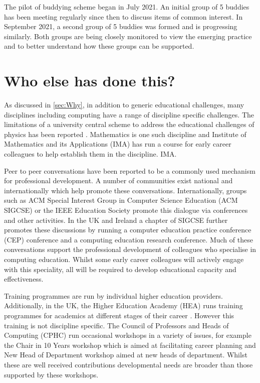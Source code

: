 \documentclass[sigconf]{acmart}
\begin{document}
\begin{comment}
To DO - evaluation of Buddying - PH what is needed here? Is sufficient to indicate the first pilot of 10 buddies has been established? Or do we need feedback from the participants?
\end{comment}

The pilot of buddying scheme began in July 2021. An initial group of 5 buddies has been meeting regularly since then to discuss items of common interest. In September 2021, a second group of 5 buddies was formed and is progressing similarly. Both groups are being closely monitored to view the emerging practice and to better understand how these groups can be supported.


\section{Who else has done this?}
As discussed in \ref{sec:Why}, in addition to generic educational challenges, many disciplines including computing have a range of discipline specific challenges. The limitations of a university central scheme to address the educational challenges of physics has been reported \cite{Magueijo2009}.  Mathematics is one such discipline and Institute of Mathematics and its Applications (IMA) has run a course for early career colleagues to help establish them in the discipline. {IMA}.  

Peer to peer conversations have been reported to be a commonly used mechanism for professional development\cite{King2004}. A number of communities exist national and internationally which help promote these conversations. Internationally, groups such as ACM Special Interest Group in Computer Science Education (ACM SIGCSE) or the IEEE Education Society promote this dialogue via conferences and other activities.  In the UK and Ireland a chapter of SIGCSE further promotes these discussions by running a computer education practice conference (CEP) conference and a computing education research conference. Much of these conversations support the professional development of colleagues who specialise in computing education. Whilst some early career colleagues will actively engage with this speciality, all will be required to develop educational capacity and effectiveness.
 
Training programmes are run by individual higher education providers. Additionally, in the UK, the Higher Education Academy (HEA) runs training programmes for academics at different stages of their career \cite{HEATraining}. However this training is not discipline specific. The Council of Professors and Heads of Computing (CPHC) run occasional workshops in a variety of issues, for example the Chair in 10 Years workshop which is aimed at facilitating career planning and New Head of Department workshop aimed at new heads of department. Whilst these are well received contributions developmental needs are broader than those supported by these workshops. 
\end{document}
